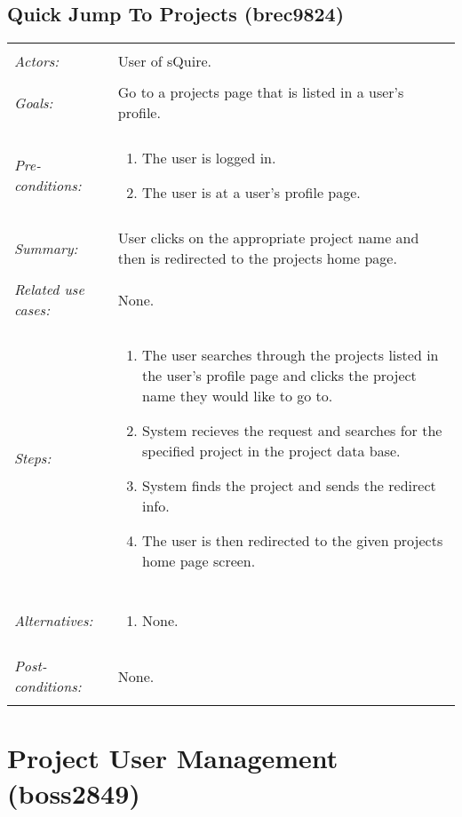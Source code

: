 \documentclass[11pt]{report}
\begin{document}
\subsection{Quick Jump To Projects (brec9824)}
\begin{tabular}{ p{2cm} p{12cm} }
 \hline
 \\
 \textit{Actors:} & User of sQuire. \\ 
 \\
 \textit{Goals:} & Go to a projects page that is listed in a user's profile. \\
 \\
 \textit{Pre-conditions:} & \begin{enumerate}
  \item The user is logged in.
  \item The user is at a user's profile page.
 \end{enumerate} \\
 \\
 \textit{Summary:} & User clicks on the appropriate project name and then is redirected to the projects home page.\\ 
 \\
 \textit{Related use cases:} & None. \\ 
 \\
 \textit{Steps:} & \begin{enumerate}
  \item The user searches through the projects listed in the user's profile page and clicks the project name they would like to go to.
  \item System recieves the request and searches for the specified project in the project data base.
  \item System finds the project and sends the redirect info.
  \item The user is then redirected to the given projects home page screen.
 \end{enumerate} \\
 \\
 \textit{Alternatives:} & \begin{enumerate} 
  \item None.
 \end{enumerate} \\
 \\
 \textit{Post-conditions:} & None. \\
 \\
\hline
\end{tabular}


\section{Project User Management (boss2849)}
\end{document}
